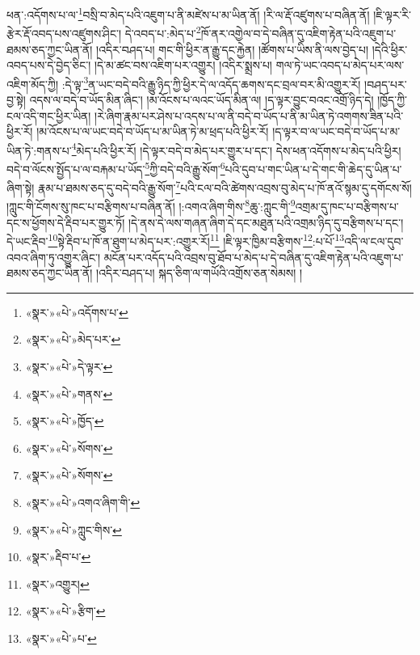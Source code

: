 ཕན་:འདོགས་པ་ལ་\footnote{«སྣར་»«པེ་»འདོགས་པ་}བསྲི་བ་མེད་པའི་འཇུག་པ་ནི་མཛེས་པ་མ་ཡིན་ནོ། །རི་ལ་རྡོ་འཛུགས་པ་བཞིན་ནོ། །ཇི་ལྟར་རི་རྩེར་རྡོ་འབད་པས་འཛུགས་ཤིང་། དེ་འབད་པ་:མེད་པ་\footnote{«སྣར་»«པེ་»མེད་པར་}ཁོ་ནར་འགྱེལ་བ་དེ་བཞིན་དུ་འཇིག་རྟེན་པའི་འཇུག་པ་ཐམས་ཅད་ཀྱང་ཡིན་ནོ། །འདིར་བཤད་པ། གང་གི་ཕྱིར་ན་རྒྱུ་དང་རྐྱེན། །ཚོགས་པ་ཡིས་ནི་ལས་བྱེད་པ། །དེའི་ཕྱིར་འབད་པས་དེ་བྱེད་ཅིང་། །དེ་མ་ཚང་བས་འཇིག་པར་འགྱུར། །འདིར་སྨྲས་པ། གལ་ཏེ་ཡང་འབད་པ་མེད་པར་ལས་འཇིག་མོད་ཀྱི། :དེ་ལྟ་\footnote{«སྣར་»«པེ་»དེ་ལྟར་}ན་ཡང་བདེ་བའི་རྒྱུ་ཉིད་ཀྱི་ཕྱིར་དེ་ལ་འདོད་ཆགས་དང་བྲལ་བར་མི་འགྱུར་རོ། །བཤད་པར་བྱ་སྟེ། འདས་ལ་བདེ་བ་ཡོད་མིན་ཞིང་། །མ་འོངས་པ་ལའང་ཡོད་མིན་ལ། །ད་ལྟར་བྱུང་བའང་འགྲོ་ཉིད་དེ། །ཁྱོད་ཀྱི་ངལ་འདི་གང་ཕྱིར་ཡིན། །རེ་ཞིག་རྣམ་པར་ཤེས་པ་འདས་པ་ལ་ནི་བདེ་བ་ཡོད་པ་ནི་མ་ཡིན་ཏེ་འགགས་ཟིན་པའི་ཕྱིར་རོ། །མ་འོངས་པ་ལ་ཡང་བདེ་བ་ཡོད་པ་མ་ཡིན་ཏེ་མ་ཕྲད་པའི་ཕྱིར་རོ། །ད་ལྟར་བ་ལ་ཡང་བདེ་བ་ཡོད་པ་མ་ཡིན་ཏེ་:གནས་པ་\footnote{«སྣར་»«པེ་»གནས་}མེད་པའི་ཕྱིར་རོ། །དེ་ལྟར་བདེ་བ་མེད་པར་གྱུར་པ་དང་། དེས་ཕན་འདོགས་པ་མེད་པའི་ཕྱིར། བདེ་བ་ལོངས་སྤྱོད་པ་ལ་བརྐམ་པ་ཡོད་\footnote{«སྣར་»«པེ་»ཁྱོད་}ཀྱི་བདེ་བའི་རྒྱུ་སོག་\footnote{«སྣར་»«པེ་»སོགས་}པའི་དུབ་པ་གང་ཡིན་པ་དེ་གང་གི་ཆེད་དུ་ཡིན་པ་ཞིག་སྟེ། རྣམ་པ་ཐམས་ཅད་དུ་བདེ་བའི་རྒྱུ་སོག་\footnote{«སྣར་»«པེ་»སོགས་}པའི་ངལ་བའི་ཚེགས་འབྲས་བུ་མེད་པ་ཁོ་ནའོ་སྙམ་དུ་དགོངས་སོ། །ཀླུང་གི་ངོགས་སུ་ཁང་པ་བརྩིགས་པ་བཞིན་ནོ། །:འགའ་ཞིག་གིས་\footnote{«སྣར་»«པེ་»འགའ་ཞིག་གི་}ཆུ་:ཀླུང་གི་\footnote{«སྣར་»«པེ་»ཀླུང་གིས་}འགྲམ་དུ་ཁང་པ་བརྩིགས་པ་དང་ས་ཕྱོགས་དེ་རྡིབ་པར་གྱུར་ཏོ། །དེ་ནས་དེ་ལས་གཞན་ཞིག་དེ་དང་མཐུན་པའི་འགྲམ་ཉིད་དུ་བརྩིགས་པ་དང་། དེ་ཡང་རྡིབ་\footnote{«སྣར་»རྡིབ་པ་}སྟེ་རྡིབ་པ་ཁོ་ན་ཐུག་པ་མེད་པར་:འགྱུར་རོ།\footnote{«སྣར་»འགྱུར།} །ཇི་ལྟར་ཁྱིམ་བརྩིགས་\footnote{«སྣར་»«པེ་»རྩིག་}:པ་པོ་\footnote{«སྣར་»«པེ་»པ་}འདི་ལ་ངལ་དུབ་འབའ་ཞིག་ཏུ་འགྱུར་ཞིང་། མངོན་པར་འདོད་པའི་འབྲས་བུ་ཐོབ་པ་མེད་པ་དེ་བཞིན་དུ་འཇིག་རྟེན་པའི་འཇུག་པ་ཐམས་ཅད་ཀྱང་ཡིན་ནོ། །འདིར་བཤད་པ། སྐད་ཅིག་ལ་གཡོའི་འགྲོས་ཅན་སེམས། །
